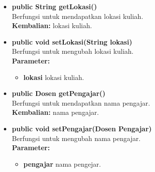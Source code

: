 \begin{enumerate}
\begin{enumerate}
\begin{itemize}
			\item \textbf{public String getLokasi()}\\
				Berfungsi untuk mendapatkan lokasi kuliah.\\
				\textbf{Kembalian:} lokasi kuliah.

			\item \textbf{public void setLokasi(String lokasi)}\\
				Berfungsi untuk mengubah lokasi kuliah.\\
				\textbf{Parameter:}
				\begin{itemize}
					\item \textbf{lokasi} lokasi kuliah.
				\end{itemize}
				
			\item \textbf{public Dosen getPengajar()}\\
				Berfungsi untuk mendapatkan nama pengajar.\\
				\textbf{Kembalian:} nama pengajar.

			\item \textbf{public void setPengajar(Dosen Pengajar)}\\
				Berfungsi untuk mengubah nama pengajar.\\
				\textbf{Parameter:}
				\begin{itemize}
					\item \textbf{pengajar} nama pengejar.
				\end{itemize}
		\end{itemize}
		

\end{enumerate}
\end{enumerate}
